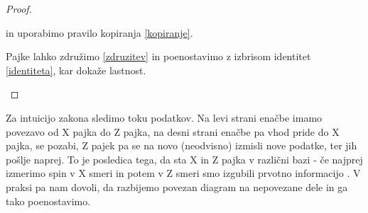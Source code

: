 \documentclass[mat1]{fmfdelo}
\begin{document}
\begin{proof}
\begin{center}
\end{center}
in uporabimo pravilo kopiranja \ref{kopiranje}.
\begin{center}
\end{center}
Pajke lahko združimo \ref{zdruzitev} in poenostavimo z izbrisom identitet \ref{identiteta}, kar dokaže lastnost.
\begin{center}
\end{center}
\end{proof}
Za intuicijo zakona sledimo toku podatkov. Na levi strani enačbe imamo povezavo od X pajka do Z pajka, na desni strani enačbe pa vhod pride do X pajka, se pozabi, Z pajek pa se na novo (neodvisno) izmisli nove podatke, ter jih pošlje naprej. To je posledica tega, da sta X in Z pajka v različni bazi - če najprej izmerimo spin v X smeri in potem v Z smeri smo izgubili prvotno informacijo \cite[definicija 8.27]{coecke_kissinger_2017}. V praksi pa nam dovoli, da razbijemo povezan diagram na nepovezane dele in ga tako poenostavimo.
\end{document}
